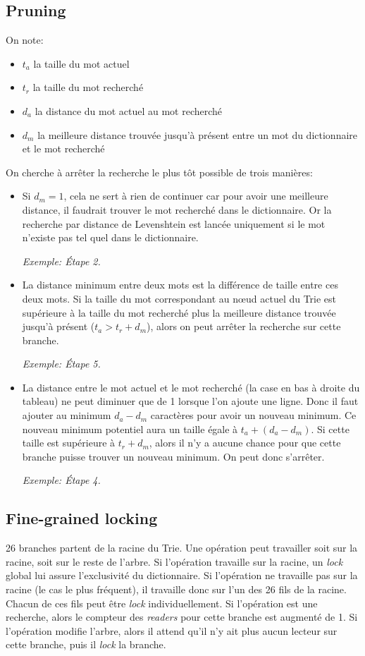 \documentclass{article}
\begin{document}
\subsection{Pruning}
On note:
\begin{itemize}
\item $t_a$ la taille du mot actuel
\item $t_r$ la taille du mot recherché
\item $d_a$ la distance du mot actuel au mot recherché
\item $d_m$ la meilleure distance trouvée jusqu'à présent entre un mot
  du dictionnaire et le mot recherché
\end{itemize}
On cherche à arrêter la recherche le plus tôt possible de trois
manières:
\begin{itemize}
\item Si $d_m = 1$, cela ne sert à rien de continuer car pour avoir une
  meilleure distance, il faudrait trouver le mot recherché dans le
  dictionnaire. Or la recherche par distance de Levenshtein est lancée
  uniquement si le mot n'existe pas tel quel dans le dictionnaire.

\textit{Exemple: Étape 2.}

\item La distance minimum entre deux mots est la différence de taille
  entre ces deux mots.
Si la taille du mot correspondant au n\oe{}ud actuel du Trie est supérieure
à la taille du mot recherché plus la meilleure distance trouvée
jusqu'à présent ($t_a > t_r + d_m$), alors on peut arrêter la
recherche sur cette branche.

\textit{Exemple: Étape 5.}

\item La distance entre le mot actuel et le mot recherché (la case en
  bas à droite du tableau) ne peut diminuer que de 1 lorsque l'on ajoute
  une ligne.
Donc il faut ajouter au minimum $d_a - d_m$ caractères pour avoir un
nouveau minimum.
Ce nouveau minimum potentiel aura un taille égale à $t_a + (d_a - d_m)$.
Si cette taille est supérieure à $t_r + d_m$, alors il n'y a aucune
chance pour que cette branche puisse trouver un nouveau minimum.
On peut donc s'arrêter.

\textit{Exemple: Étape 4.}
\end{itemize}

\subsection{Fine-grained locking}
26 branches partent de la racine du Trie.
Une opération peut travailler soit sur la racine, soit sur le reste de
l'arbre.
Si l'opération travaille sur la racine, un \textit{lock} global lui
assure l'exclusivité du dictionnaire.
Si l'opération ne travaille pas sur la racine (le cas le plus fréquent),
il travaille donc sur l'un des 26 fils de la racine.
Chacun de ces fils peut être \textit{lock} individuellement.
Si l'opération est une recherche, alors le compteur des \textit{readers}
pour cette branche est augmenté de 1.
Si l'opération modifie l'arbre, alors il attend qu'il n'y ait plus aucun
lecteur sur cette branche, puis il \textit{lock} la branche.
\end{document}
